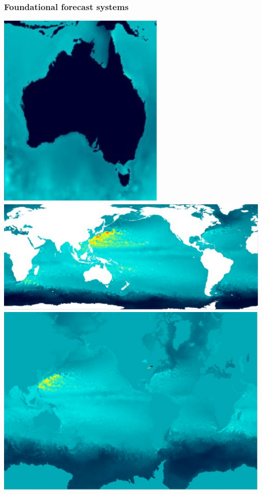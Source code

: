 \begin{frame}
\frametitle{Foundational forecast systems}   
\centering
    \includegraphics[height=0.4\textheight]{figures/maps/ocean_ROMS.png} 
    \includegraphics[height=0.4\textheight]{figures/maps/ocean_oceanmaps.png}
    \includegraphics[height=0.4\textheight]{figures/maps/ocean_accesss.png}
\end{frame}

